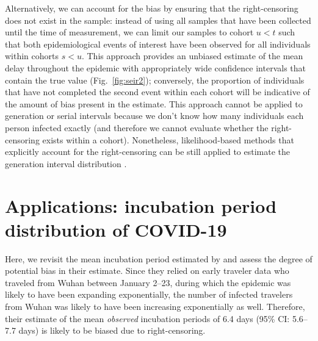 \documentclass[12pt]{article}
\newcommand{\fref}[1]{Fig.~\ref{fig:#1}}
\begin{document}
Alternatively, we can account for the bias by ensuring that the right-censoring does not exist in the sample:
instead of using all samples that have been collected until the time of measurement, we can limit our samples to cohort $u < t$ such that both epidemiological events of interest have been observed for all individuals within cohorts $s < u$.
This approach provides an unbiased estimate of the mean delay throughout the epidemic with appropriately wide confidence intervals that contain the true value (\fref{seir2});
conversely, the proportion of individuals that have not completed the second event within each cohort will be indicative of the amount of bias present in the estimate.
This approach cannot be applied to generation or serial intervals because we don't know how many individuals each person infected exactly (and therefore we cannot evaluate whether the right-censoring exists within a cohort).
Nonetheless, likelihood-based methods that explicitly account for the right-censoring can be still applied to estimate the generation interval distribution \citep{park2019inferring}.

\section{Applications: incubation period distribution of COVID-19}

Here, we revisit the mean incubation period estimated by \cite{backer2020incubation} and assess the degree of potential bias in their estimate.
Since they relied on early traveler data who traveled from Wuhan between January 2--23, during which the epidemic was likely to have been expanding exponentially,
the number of infected travelers from Wuhan was likely to have been increasing exponentially as well.
Therefore, their estimate of the mean \emph{observed} incubation periods of 6.4 days (95\% CI: 5.6–7.7 days) is likely to be biased due to right-censoring.
\end{document}
